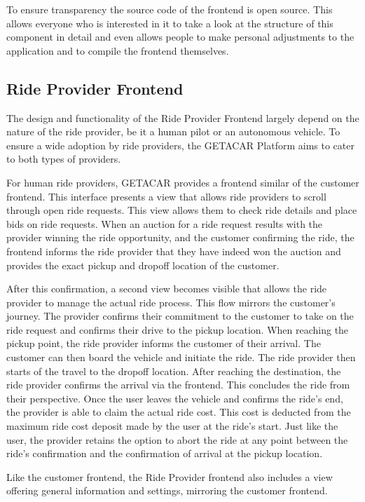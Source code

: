 To ensure transparency the source code of the frontend is open source. This allows everyone who is interested in it to take a look at the structure of this component in detail and even allows people to make personal adjustments to the application and to compile the frontend themselves.

\subsection{Ride Provider Frontend}\label{subsec:RideProviderFrontend}
The design and functionality of the Ride Provider Frontend largely depend on the nature of the ride provider, be it a human pilot or an autonomous vehicle. To ensure a wide adoption by ride providers, the GETACAR Platform aims to cater to both types of providers.

For human ride providers, GETACAR provides a frontend similar of the customer frontend. This interface presents a view that allows ride providers to scroll through open ride requests. This view allows them to check ride details and place bids on ride requests. When an auction for a ride request results with the provider winning the ride opportunity, and the customer confirming the ride, the frontend informs the ride provider that they have indeed won the auction and provides the exact pickup and dropoff location of the customer.

After this confirmation, a second view becomes visible that allows the ride provider to manage the actual ride process. This flow mirrors the customer's journey. The provider confirms their commitment to the customer to take on the ride request and confirms their drive to the pickup location. When reaching the pickup point, the ride provider informs the customer of their arrival. The customer can then board the vehicle and initiate the ride. The ride provider then starts of the travel to the dropoff location. After reaching the destination, the ride provider confirms the arrival via the frontend. This  concludes the ride from their perspective. Once the user leaves the vehicle and confirms the ride's end, the provider is able to claim the actual ride cost. This cost is deducted from the maximum ride cost deposit made by the user at the ride's start. 
Just like the user, the provider retains the option to abort the ride at any point between the ride's confirmation and the confirmation of arrival at the pickup location.


Like the customer frontend, the Ride Provider frontend also includes a view offering general information and settings, mirroring the customer frontend.

